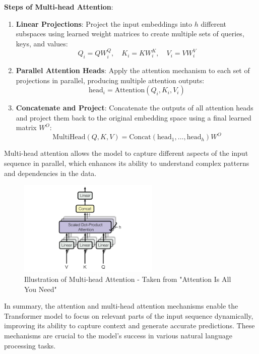                 \textbf{Steps of Multi-head Attention}:
                \begin{enumerate}
                    \item \textbf{Linear Projections}: Project the input embeddings into \(h\) different subspaces using learned weight matrices to create multiple sets of queries, keys, and values:
                    \[
                    Q_i = QW_i^Q, \quad K_i = KW_i^K, \quad V_i = VW_i^V
                    \]

                    \item \textbf{Parallel Attention Heads}: Apply the attention mechanism to each set of projections in parallel, producing multiple attention outputs:
                    \[
                    \text{head}_i = \text{Attention}(Q_i, K_i, V_i)
                    \]

                    \item \textbf{Concatenate and Project}: Concatenate the outputs of all attention heads and project them back to the original embedding space using a final learned matrix \(W^O\):
                    \[
                    \text{MultiHead}(Q, K, V) = \text{Concat}(\text{head}_1, \ldots, \text{head}_h)W^O
                    \]
                \end{enumerate}
                Multi-head attention allows the model to capture different aspects of the input sequence in parallel, which enhances its ability to understand complex patterns and dependencies in the data.
                \begin{figure}[H]
                    \centering
                    \includegraphics[width=0.6\textwidth]{figs/Multi_head_attention.png}
                    \caption{Illustration of Multi-head Attention - Taken from "Attention Is All You Need"}
                    \label{fig:multi_head_attention}
                \end{figure}
                In summary, the attention and multi-head attention mechanisms enable the Transformer model to focus on relevant parts of the input sequence dynamically, improving its ability to capture context and generate accurate predictions. These mechanisms are crucial to the model's success in various natural language processing tasks.
                                        
